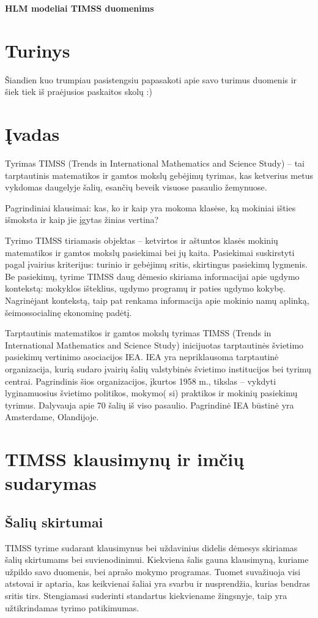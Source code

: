 \documentclass[12pt,a4paper]{article}
\begin{document}
	\begin{center}{\large\textbf{HLM modeliai TIMSS duomenims}}\end{center}

\section{Turinys}
Šiandien kuo trumpiau pasistengsiu papasakoti apie savo turimus duomenis ir šiek tiek iš praėjusios paskaitos skolų :)
\section{Įvadas}
Tyrimas TIMSS (Trends in International Mathematics and Science Study) – tai tarptautinis matematikos ir gamtos mokslų gebėjimų tyrimas, kas ketverius metus vykdomas daugelyje šalių, esančių beveik visuose pasaulio žemynuose.

Pagrindiniai klausimai: kas, ko ir kaip yra mokoma klasėse, ką mokiniai išties išmoksta ir kaip jie įgytas žinias vertina?

Tyrimo TIMSS tiriamasis objektas – ketvirtos ir aštuntos klasės mokinių matematikos ir gamtos mokslų pasiekimai bei jų kaita. Pasiekimai suskirstyti pagal įvairius kriterijus: turinio ir gebėjimų sritis, skirtingus pasiekimų lygmenis. Be pasiekimų, tyrime TIMSS daug dėmesio skiriama informacijai apie ugdymo kontekstą: mokyklos išteklius, ugdymo programų ir paties ugdymo kokybę. Nagrinėjant kontekstą, taip pat renkama informacija apie mokinio namų aplinką, šeimossocialinę ekonominę padėtį. 

Tarptautinis matematikos ir gamtos mokslų tyrimas TIMSS (Trends in International Mathematics and Science Study) inicijuotas tarptautinės švietimo pasiekimų vertinimo asociacijos IEA. IEA yra nepriklausoma tarptautinė organizacija, kurią sudaro įvairių  šalių valstybinės švietimo institucijos bei tyrimų centrai. Pagrindinis šios organizacijos, įkurtos 1958 m., tikslas – vykdyti lyginamuosius švietimo politikos, mokymo( si) praktikos ir mokinių pasiekimų tyrimus. Dalyvauja apie 70 šalių iš viso pasaulio. Pagrindinė IEA būstinė yra Amsterdame, Olandijoje.


\section{TIMSS klausimynų ir imčių sudarymas}
\subsection{Šalių skirtumai}
TIMSS tyrime sudarant klausimynus bei uždavinius didelis dėmesys skiriamas šalių skirtumams bei suvienodinimui. Kiekviena šalis gauna klausimyną, kuriame užpildo savo duomenis, bei aprašo mokymo programas. Tuomet suvažiuoja visi atstovai ir aptaria, kas keikvienai šaliai yra svarbu ir nusprendžia, kurias bendras sritis tirs. Stengiamasi suderinti standartus kiekviename žingsnyje, taip yra užtikrindamas tyrimo patikimumas.
\end{document}
